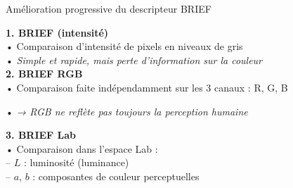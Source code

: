 \begin{frame}{Amélioration progressive du descripteur BRIEF}
\small

\textbf{1. BRIEF (intensité)} \\
\hspace{1em}• Comparaison d’intensité de pixels en niveaux de gris \\
\hspace{1em}• \textit{Simple et rapide, mais perte d'information sur la couleur} \\

\pause
\vspace{0.5em}
\textbf{2. BRIEF RGB} \\
\hspace{1em}• Comparaison faite indépendamment sur les 3 canaux : R, G, B \\
\vspace{0.5em}
\hspace{1em}
\begin{minipage}{\linewidth}
\centering
\setlength{\fboxsep}{0pt}
\end{minipage}

\vspace{0.8em}
\hspace{1em}• \textit{→ RGB ne reflète pas toujours la perception humaine}

\pause
\vspace{0.5em}
\textbf{3. BRIEF Lab} \\
\hspace{1em}• Comparaison dans l’espace Lab : \\
\hspace{2em}– $L$ : luminosité (luminance) \\
\hspace{2em}– $a$, $b$ : composantes de couleur perceptuelles \\

\end{frame}
